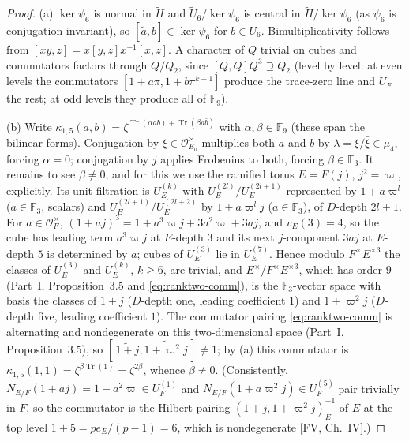 \documentclass[11pt]{article}
\newcommand{\Fq}{\mathbb F}
\newcommand{\Tr}{\operatorname{Tr}}
\newcommand{\tH}{\widetilde H}
\newcommand{\tU}{\widetilde U}
\newcommand{\Ocal}{\mathcal O}
\theoremstyle{plain}
\theoremstyle{definition}
\begin{document}
\begin{proof}
(a) $\ker\psi_6$ is normal in $\tH$ and $\tU_6/\ker\psi_6$ is central
in $\tH/\ker\psi_6$ (as $\psi_6$ is conjugation invariant), so
$[\tilde a,\tilde b]\in\ker\psi_6$ for $b\in U_6$.  Bimultiplicativity
follows from $[xy,z]=x[y,z]x^{-1}[x,z]$.  A character of $Q$ trivial on
cubes and commutators factors through $Q/Q_2$, since
$[Q,Q]Q^3\supseteq Q_2$ (level by level: at even levels the commutators
$[1+a\pi,1+b\pi^{k-1}]$ produce the trace-zero line and $U_F$ the rest;
at odd levels they produce all of $\Fq_9$).

(b) Write $\kappa_{1,5}(a,b)=\zeta^{\Tr(\alpha ab)+\Tr(\beta a\bar b)}$ with
$\alpha,\beta\in\Fq_9$ (these span the bilinear forms).  Conjugation
by $\xi\in\Ocal_{E_0}^\times$ multiplies both $a$ and $b$ by
$\lambda=\xi/\bar\xi\in\mu_4$, forcing $\alpha=0$; conjugation by $j$
applies Frobenius to both, forcing $\beta\in\Fq_3$.  It remains to see
$\beta\ne0$, and for this we use the ramified torus $E=F(j)$,
$j^2=\varpi$, explicitly.  Its unit filtration is $U_E^{(k)}$ with
$U_E^{(2l)}/U_E^{(2l+1)}$ represented by $1+a\varpi^l$ ($a\in\Fq_3$, scalars)
and $U_E^{(2l+1)}/U_E^{(2l+2)}$ by $1+a\varpi^lj$ ($a\in\Fq_3$), of
$D$-depth $2l+1$.  For $a\in\Ocal_F^\times$,
$(1+aj)^3=1+a^3\varpi j+3a^2\varpi+3aj$, and $v_E(3)=4$, so the cube
has leading term $a^3\varpi j$ at $E$-depth $3$ and its next
$j$-component $3aj$ at $E$-depth $5$ is determined by $a$; cubes of
$U_E^{(3)}$ lie in $U_E^{(7)}$.  Hence modulo $F^\times E^{\times3}$ the
classes of $U_E^{(3)}$ and $U_E^{(k)}$, $k\ge6$, are trivial, and
$E^\times/F^\times E^{\times3}$, which has order $9$ (Part~I,
Proposition~3.5 and \eqref{eq:ranktwo-comm}), is the $\Fq_3$-vector space
with basis the classes of $1+j$ ($D$-depth one, leading coefficient
$1$) and $1+\varpi^2j$ ($D$-depth five, leading coefficient $1$).  The
commutator pairing \eqref{eq:ranktwo-comm} is alternating and
nondegenerate on this two-dimensional space (Part~I, Proposition~3.5),
so $[\,\widetilde{1+j},\widetilde{1+\varpi^2j}\,]\ne1$; by (a) this
commutator is $\kappa_{1,5}(1,1)=\zeta^{\beta\Tr(1)}=\zeta^{2\beta}$,
whence $\beta\ne0$.  (Consistently, $N_{E/F}(1+aj)=1-a^2\varpi\in U_F^{(1)}$
and $N_{E/F}(1+a\varpi^2j)\in U_F^{(5)}$ pair trivially in $F$, so the
commutator is the Hilbert pairing $(1+j,1+\varpi^2j)_E^{-1}$ of $E$ at the
top level $1+5=pe_E/(p-1)=6$, which is nondegenerate [FV, Ch.~IV].)


\end{proof}
\end{document}
